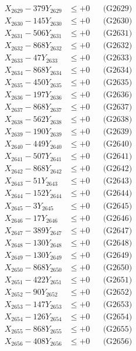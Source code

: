 \documentclass[a4paper,10pt]{article}
\begin{document}
{\begin{align}
X_{2629} - 379Y_{2629} &\leq +0 && \text{(G2629)} \\
X_{2630} - 145Y_{2630} &\leq +0 && \text{(G2630)} \\
\allowbreak
X_{2631} - 506Y_{2631} &\leq +0 && \text{(G2631)} \\
X_{2632} - 868Y_{2632} &\leq +0 && \text{(G2632)} \\
X_{2633} - 47Y_{2633} &\leq +0 && \text{(G2633)} \\
X_{2634} - 868Y_{2634} &\leq +0 && \text{(G2634)} \\
X_{2635} - 450Y_{2635} &\leq +0 && \text{(G2635)} \\
X_{2636} - 197Y_{2636} &\leq +0 && \text{(G2636)} \\
X_{2637} - 868Y_{2637} &\leq +0 && \text{(G2637)} \\
X_{2638} - 562Y_{2638} &\leq +0 && \text{(G2638)} \\
X_{2639} - 190Y_{2639} &\leq +0 && \text{(G2639)} \\
X_{2640} - 449Y_{2640} &\leq +0 && \text{(G2640)} \\
\allowbreak
X_{2641} - 507Y_{2641} &\leq +0 && \text{(G2641)} \\
X_{2642} - 868Y_{2642} &\leq +0 && \text{(G2642)} \\
X_{2643} - 51Y_{2643} &\leq +0 && \text{(G2643)} \\
X_{2644} - 152Y_{2644} &\leq +0 && \text{(G2644)} \\
X_{2645} - 3Y_{2645} &\leq +0 && \text{(G2645)} \\
X_{2646} - 17Y_{2646} &\leq +0 && \text{(G2646)} \\
X_{2647} - 389Y_{2647} &\leq +0 && \text{(G2647)} \\
X_{2648} - 130Y_{2648} &\leq +0 && \text{(G2648)} \\
X_{2649} - 130Y_{2649} &\leq +0 && \text{(G2649)} \\
X_{2650} - 868Y_{2650} &\leq +0 && \text{(G2650)} \\
\allowbreak
X_{2651} - 422Y_{2651} &\leq +0 && \text{(G2651)} \\
X_{2652} - 90Y_{2652} &\leq +0 && \text{(G2652)} \\
X_{2653} - 147Y_{2653} &\leq +0 && \text{(G2653)} \\
X_{2654} - 126Y_{2654} &\leq +0 && \text{(G2654)} \\
X_{2655} - 868Y_{2655} &\leq +0 && \text{(G2655)} \\
X_{2656} - 408Y_{2656} &\leq +0 && \text{(G2656)} \\

\end{align}}
\end{document}
